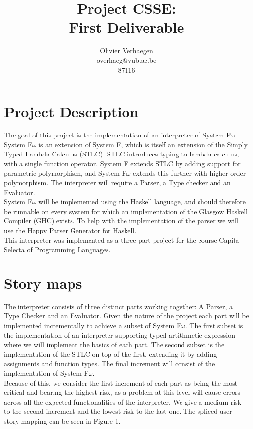 \documentclass[pdftex,a4paper,11pt]{article}
\title{Project CSSE:\\
       First Deliverable}
\author{Olivier Verhaegen\\	
	overhaeg@vub.ac.be\\
	87116}
\begin{document}
\maketitle


\section{Project Description}

The goal of this project is the implementation of an interpreter of System F$\omega$. System F$\omega$ is an extension of System F, which is itself an extension of 
the Simply Typed Lambda Calculus (STLC). STLC introduces typing to lambda calculus, with a single function operator. 
System F extends STLC by adding support for parametric polymorphism, and System F$\omega$ extends this further with higher-order polymorphism. 
The interpreter will require a Parser, a Type checker and an Evaluator.\\
\noindent
System F$\omega$ will be implemented using the Haskell language, and should therefore be runnable on every system for which an implementation of the Glasgow Haskell Compiler (GHC) exists.
To help with the implementation of the parser we will use the Happy Parser Generator for Haskell.\\
This interpreter was implemented as a three-part project for the course Capita Selecta of Programming Languages. 


\section{Story maps}

The interpreter consists of three distinct parts working together: A Parser, a Type Checker and an Evaluator. Given the nature of the project each part will be implemented 
incrementally to achieve a subset of System F$\omega$. The first subset is the implementation of an interpreter supporting typed artithmetic expression where we will implement the basics of each part. 
The second subset is the implementation of the STLC on top of the first, extending it by adding assignments and function types. The final increment will consist of the implementation of System F$\omega$.\\
Because of this, we consider the first increment of each part as being the most critical and bearing the highest risk, as a problem at this level will cause errors across all the 
expected functionalities of the interpreter. We give a medium risk to the second increment and the lowest risk to the last one. The spliced user story mapping can be seen in Figure 1. 
\end{document}
